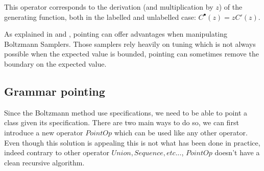 \documentclass{article}
\begin{document}
This operator corresponds to the derivation (and multiplication by $z$) of the generating function, both in the labelled and unlabelled case: $C^{\bullet}(z) = z C'(z)$.

As explained in \cite{BS} and \cite{MEMO}, pointing can offer advantages when manipulating Boltzmann Samplers. Those samplers rely heavily on tuning which is not always possible when the expected value is bounded, pointing can sometimes remove the boundary on the expected value.

\subsection{Grammar pointing}

Since the Boltzmann method use specifications, we need to be able to point a class given its specification. There are two main ways to do so, we can first introduce a new operator $PointOp$ which can be used like any other operator. Even though this solution is appealing this is not what has been done in practice, indeed contrary to other operator $Union, Sequence, etc...$, $PointOp$ doesn't have a clean recursive algorithm.
\end{document}
